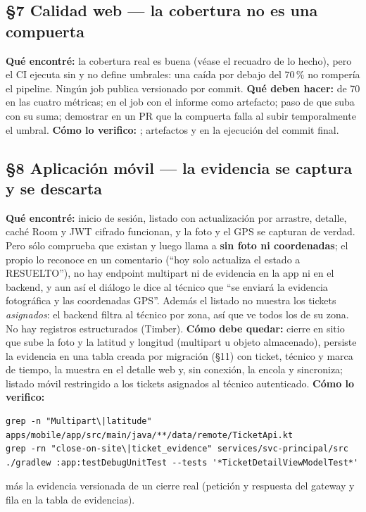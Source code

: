 \subsection*{\S7 Calidad web --- la cobertura no es una compuerta}
\textbf{Qu\'e encontr\'e:} la cobertura real es buena (v\'ease el recuadro de lo hecho), pero el CI ejecuta  sin  y  no define umbrales: una ca\'ida por debajo del 70\,\% no romper\'ia el pipeline. Ning\'un job publica  versionado por commit. \textbf{Qu\'e deben hacer:}  de 70 en las cuatro m\'etricas;  en el job con el informe como artefacto; paso de  que suba  con su suma; demostrar en un PR que la compuerta falla al subir temporalmente el umbral. \textbf{C\'omo lo verifico:} ; artefactos  y  en la ejecuci\'on del commit final.

\subsection*{\S8 Aplicaci\'on m\'ovil --- la evidencia se captura y se descarta}
\textbf{Qu\'e encontr\'e:} inicio de sesi\'on, listado con actualizaci\'on por arrastre, detalle, cach\'e Room y JWT cifrado funcionan, y la foto y el GPS se capturan de verdad. Pero  s\'olo comprueba que existan y luego llama a  \textbf{sin foto ni coordenadas}; el propio  lo reconoce en un comentario (``hoy solo actualiza el estado a RESUELTO''), no hay endpoint multipart ni de evidencia en la app ni en el backend, y aun as\'i el di\'alogo le dice al t\'ecnico que ``se enviar\'a la evidencia fotogr\'afica y las coordenadas GPS''. Adem\'as el listado no muestra los tickets \emph{asignados}: el backend filtra al t\'ecnico por zona, as\'i que ve todos los de su zona. No hay registros estructurados (Timber). \textbf{C\'omo debe quedar:} cierre en sitio que sube la foto y la latitud y longitud (multipart u objeto almacenado), persiste la evidencia en una tabla creada por migraci\'on (\S11) con ticket, t\'ecnico y marca de tiempo, la muestra en el detalle web y, sin conexi\'on, la encola y sincroniza; listado m\'ovil restringido a los tickets asignados al t\'ecnico autenticado. \textbf{C\'omo lo verifico:}\begin{verbatim}
grep -n "Multipart\|latitude" apps/mobile/app/src/main/java/**/data/remote/TicketApi.kt
grep -rn "close-on-site\|ticket_evidence" services/svc-principal/src
./gradlew :app:testDebugUnitTest --tests '*TicketDetailViewModelTest*'
\end{verbatim}
m\'as la evidencia versionada de un cierre real (petici\'on y respuesta del gateway y fila en la tabla de evidencias).

